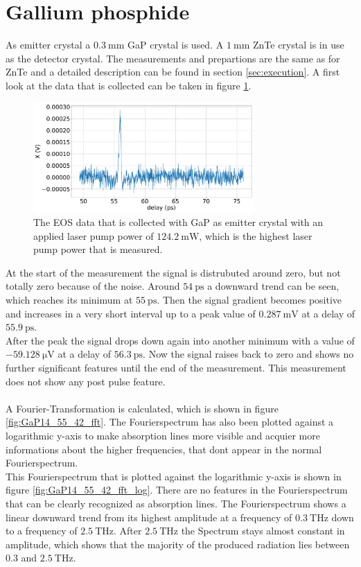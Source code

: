 \section{Gallium phosphide}
As emitter crystal a $\SI{0.3}{\milli\meter}$ GaP crystal is used.
A $\SI{1}{\milli\meter}$ ZnTe crystal is in use as the detector crystal.
The measurements and prepartions are the same as for ZnTe and a detailed description can be found in section \ref{sec:execution}.
A first look at the data that is collected can be taken in figure \ref{fig:GaP14_55_42normalX}.
\\
\begin{figure}
    \centering
    \includegraphics[width=0.75\textwidth]{Plots/GaP14_55_42normalX.pdf}
    \caption{The EOS data that is collected with GaP as emitter crystal with an applied laser pump power of $\SI{124.2}{\milli\W}$, which is the highest laser pump power that is measured.}
    \label{fig:GaP14_55_42normalX}
\end{figure}
At the start of the measurement the signal is distrubuted around zero, but not totally zero because of the noise.
Around $\SI{54}{\pico\second}$ a downward trend can be seen, which reaches its minimum at $\SI{55}{\pico\second}$.
Then the signal gradient becomes positive and increases in a very short interval up to a peak value of $\SI{0.287}{\milli\V}$ at a delay of $\SI{55.9}{\pico\second}$.
\\
After the peak the signal drops down again into another minimum with a value of $\SI{-59.128}{\micro\V}$ at a delay of $\SI{56.3}{\pico\second}$.
Now the signal raises back to zero and shows no further significant features until the end of the measurement.
This measurement does not show any post pulse feature.
\\\\
A Fourier-Transformation is calculated, which is shown in figure \ref{fig:GaP14_55_42_fft}.
The Fourierspectrum has also been plotted against a logarithmic y-axis to make absorption lines more visible and acquier more informations about the higher frequencies, that dont appear in the normal Fourierspectrum.
\\
This Fourierspectrum that is plotted against the logarithmic y-axis is shown in figure \ref{fig:GaP14_55_42_fft_log}.
There are no features in the Fourierspectrum that can be clearly recognized as absorption lines.
The Fourierspectrum shows a linear downward trend from its highest amplitude at a frequency of $\SI{0.3}{\tera\hertz}$ down to a frequency of $\SI{2.5}{\tera\hertz}$.
After $\SI{2.5}{\tera\hertz}$ the Spectrum stays almost constant in amplitude, which shows that the majority of the produced radiation lies between $0.3$ and $\SI{2.5}{\tera\hertz}$.

